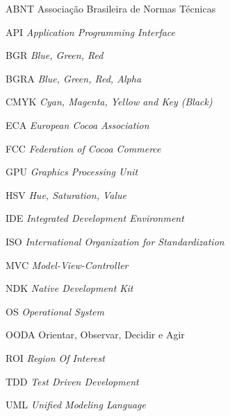 \begin{siglas}
\item[ABNT] Associação Brasileira de Normas Técnicas
\item[API] \textit{Application Programming Interface}
\item[BGR] \textit{Blue, Green, Red}
\item[BGRA] \textit{Blue, Green, Red, Alpha}
\item[CMYK] \textit{Cyan, Magenta, Yellow and Key (Black)}
\item[ECA] \textit{European Cocoa Association}
\item[FCC] \textit{Federation of Cocoa Commerce}
\item[GPU] \textit{Graphics Processing Unit}
\item[HSV] \textit{Hue, Saturation, Value}
\item[IDE] \textit{Integrated Development Environment}
\item[ISO] \textit{International Organization for Standardization}
\item[MVC] \textit{Model-View-Controller}
\item[NDK] \textit{Native Development Kit}
\item[OS] \textit{Operational System}
\item[OODA] Orientar, Observar, Decidir e Agir
\item[ROI] \textit{Region Of Interest}
\item[TDD] \textit{Test Driven Development}
\item[UML] \textit{Unified Modeling Language}
\end{siglas}





